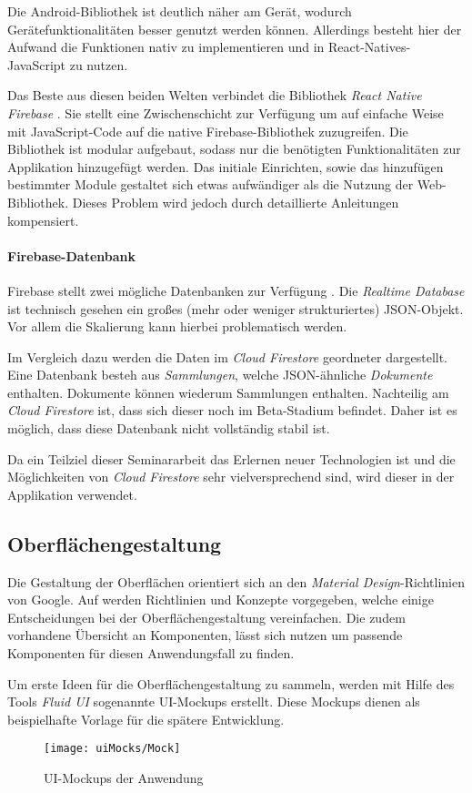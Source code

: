 Die Android-Bibliothek ist deutlich näher am Gerät, wodurch Gerätefunktionalitäten besser genutzt werden können.
Allerdings besteht hier der Aufwand die Funktionen nativ zu implementieren und in React-Natives-JavaScript zu nutzen.

Das Beste aus diesen beiden Welten verbindet die Bibliothek \textit{React Native Firebase} \cite{invertas78:online}.
Sie stellt eine Zwischenschicht zur Verfügung um auf einfache Weise mit JavaScript-Code auf die native Firebase-Bibliothek zuzugreifen.
Die Bibliothek ist modular aufgebaut, sodass nur die benötigten Funktionalitäten zur Applikation hinzugefügt werden.
Das initiale Einrichten, sowie das hinzufügen bestimmter Module gestaltet sich etwas aufwändiger als die Nutzung der Web-Bibliothek.
Dieses Problem wird jedoch durch detaillierte Anleitungen kompensiert.

\paragraph{Firebase-Datenbank}
Firebase stellt zwei mögliche Datenbanken zur Verfügung \cite{ChooseaD77:online}.
Die \textit{Realtime Database} ist technisch gesehen ein großes (mehr oder weniger strukturiertes) JSON-Objekt.
Vor allem die Skalierung kann hierbei problematisch werden.

Im Vergleich dazu werden die Daten im \textit{Cloud Firestore} geordneter dargestellt.
Eine Datenbank besteh aus \textit{Sammlungen}, welche JSON-ähnliche \textit{Dokumente} enthalten.
Dokumente können wiederum Sammlungen enthalten.
Nachteilig am \textit{Cloud Firestore} ist, dass sich dieser noch im Beta-Stadium befindet.
Daher ist es möglich, dass diese Datenbank nicht vollständig stabil ist.

Da ein Teilziel dieser Seminararbeit das Erlernen neuer Technologien ist und die Möglichkeiten von \textit{Cloud Firestore} sehr vielversprechend sind, 
wird dieser in der Applikation verwendet. 

\subsection{Oberflächengestaltung}
Die Gestaltung der Oberflächen orientiert sich an den \textit{Material Design}-Richtlinien von Google.
Auf \cite{DesignMa49:online} werden Richtlinien und Konzepte vorgegeben,
welche einige Entscheidungen bei der Oberflächengestaltung vereinfachen.
Die zudem vorhandene Übersicht an Komponenten, lässt sich nutzen um passende Komponenten für diesen Anwendungsfall zu finden.

Um erste Ideen für die Oberflächengestaltung zu sammeln,
werden mit Hilfe des Tools \textit{Fluid UI} \cite{FluidUIc8:online} sogenannte UI-Mockups erstellt.
Diese Mockups dienen als beispielhafte Vorlage für die spätere Entwicklung.


\begin{figure}[h]
    \centering
    \texttt{[image: uiMocks/Mock]}
    \caption{UI-Mockups der Anwendung}
\end{figure}




